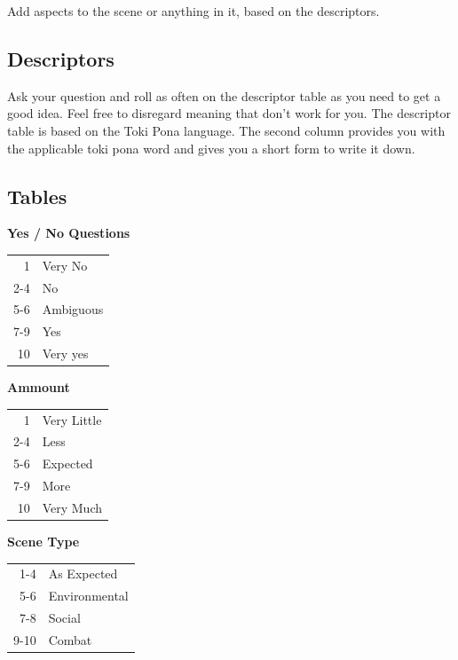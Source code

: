 \documentclass[11pt]{article}
\begin{document}
{Add aspects to the scene or anything in it, based on the descriptors.
\subsection{Descriptors}
\label{sec:orgc10c108}

Ask your question and roll as often on the descriptor table as you need to get a good idea. Feel free to disregard meaning that don't work for you.
The descriptor table is based on the Toki Pona language. The second column provides you with the applicable toki pona word and gives you a short form to write it down. 


\newpage
\subsection{Tables}
\label{sec:org9a28015}
\begin{multicols}{3}[]
\begin{center}
\textbf{Yes / No Questions}
\begin{center}
\begin{tabular}{rl}
1 & Very No\\
2-4 & No\\
5-6 & Ambiguous\\
7-9 & Yes\\
10 & Very yes\\
\end{tabular}
\end{center}
\columnbreak
\textbf{Ammount}
\begin{center}
\begin{tabular}{rl}
1 & Very Little\\
2-4 & Less\\
5-6 & Expected\\
7-9 & More\\
10 & Very Much\\
\end{tabular}
\end{center}
\columnbreak
\textbf{Scene Type}
\begin{center}
\begin{tabular}{rl}
1-4 & As Expected\\
5-6 & Environmental\\
7-8 & Social\\
9-10 & Combat\\
\end{tabular}
\end{center}
\end{center}
\end{multicols}


}
\end{document}
